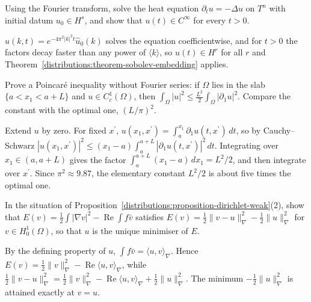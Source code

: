 \begin{exercise}\label{distributions:exercise-heat-kernel}
Using the Fourier transform, solve the heat equation $\partial_tu = -\Delta u$ on $T^n$ with initial datum $u_0 \in H^s$, and show that $u(t) \in C^\infty$ for every $t > 0$.
\end{exercise}

\begin{solution}
$\hat u(k, t) = e^{-4\pi^2|k|^2t}\hat u_0(k)$ solves the equation coefficientwise, and for $t > 0$ the factors decay faster than any power of $\langle k\rangle$, so $u(t) \in H^r$ for all $r$ and
Theorem~\ref{distributions:theorem-sobolev-embedding} applies.
\end{solution}

\begin{exercise}\label{distributions:exercise-poincare-elementary}
Prove a Poincar\'e inequality without Fourier series: if $\Omega$ lies in the slab $\{a < x_1 < a + L\}$ and $u \in C^1_c(\Omega)$, then $\int_\Omega|u|^2 \leq \frac{L^2}{2}\int_\Omega|\partial_1u|^2$.
Compare the constant with the optimal one, $(L/\pi)^2$.
\end{exercise}

\begin{solution}
Extend $u$ by zero. For fixed $x^{\prime}$, $u(x_1, x^{\prime}) = \int_a^{x_1}\partial_1u(t, x^{\prime})\,dt$, so by Cauchy--Schwarz $|u(x_1, x^{\prime})|^2 \leq (x_1 - a)\int_a^{a+L}|\partial_1u(t, x^{\prime})|^2\,dt$.
Integrating over $x_1 \in (a, a + L)$ gives the factor $\int_a^{a+L}(x_1 - a)\,dx_1 = L^2/2$, and then integrate over $x^{\prime}$. Since $\pi^2 \approx 9.87$, the elementary constant $L^2/2$ is about five times
the optimal one.
\end{solution}

\begin{exercise}\label{distributions:exercise-dirichlet-energy}
In the situation of Proposition~\ref{distributions:proposition-dirichlet-weak}(2), show that $E(v) = \frac12\int|\nabla v|^2 - \operatorname{Re}\int f\bar v$ satisfies
$E(v) = \frac12\|v - u\|_\nabla^2 - \frac12\|u\|_\nabla^2$ for $v \in H^1_0(\Omega)$, so that $u$ is the unique minimiser of $E$.
\end{exercise}

\begin{solution}
By the defining property of $u$, $\int f\bar v = \langle u, v\rangle_\nabla$. Hence $E(v) = \frac12\|v\|_\nabla^2 - \operatorname{Re}\langle u, v\rangle_\nabla$, while
$\frac12\|v - u\|_\nabla^2 = \frac12\|v\|_\nabla^2 - \operatorname{Re}\langle u, v\rangle_\nabla + \frac12\|u\|_\nabla^2$. The minimum $-\frac12\|u\|_\nabla^2$ is attained exactly at $v = u$.
\end{solution}

